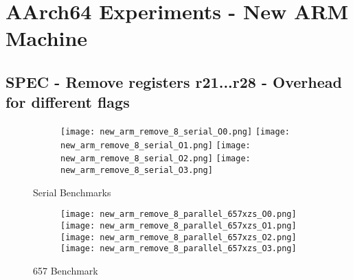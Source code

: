 \documentclass[11pt]{article}
\begin{document}
    \section*{AArch64 Experiments - New ARM Machine}

    \subsection*{SPEC - Remove registers r21...r28 - Overhead for different flags}

    \begin{figure}[ht]
        \begin{subfigure}{\linewidth}
            \texttt{[image: new\_arm\_remove\_8\_serial\_O0.png]}\hfill
            \texttt{[image: new\_arm\_remove\_8\_serial\_O1.png]}\hfill
            \texttt{[image: new\_arm\_remove\_8\_serial\_O2.png]}\hfill
            \texttt{[image: new\_arm\_remove\_8\_serial\_O3.png]}\hfill
        \end{subfigure}\par\medskip
        \caption{Serial Benchmarks}
        \label{fig:new_arm_figs_1}
    \end{figure}

    \begin{figure}[ht]
        \begin{subfigure}{\linewidth}
            \texttt{[image: new\_arm\_remove\_8\_parallel\_657xzs\_O0.png]}\hfill
            \texttt{[image: new\_arm\_remove\_8\_parallel\_657xzs\_O1.png]}\hfill
            \texttt{[image: new\_arm\_remove\_8\_parallel\_657xzs\_O2.png]}\hfill
            \texttt{[image: new\_arm\_remove\_8\_parallel\_657xzs\_O3.png]}\hfill
        \end{subfigure}\par\medskip
        \caption{657 Benchmark}
        \label{fig:new_arm_figs_2}
    \end{figure}
\end{document}
